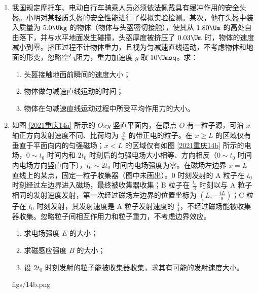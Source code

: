 \documentclass[\gkver]{gaokaozhenti}
\begin{document}
\begin{enumerate}
\item
我国规定摩托车、电动自行车骑乘人员必须依法佩戴具有缓冲作用的安全头盔。小明对某轻质头盔的安全性能进行了模拟实验检测。某次，他在头盔中装入质量为 $5.0\Ukg$ 的物体（物体与头盔密切接触），使其从 $1.80\Um$ 的高处自由落下，并与水平地面发生碰撞，头盔厚度被挤压了 $0.03\Um$ 时，物体的速度减小到零。挤压过程不计物体重力，且视为匀减速直线运动，不考虑物体和地面的形变，忽略空气阻力，重力加速度 $g$ 取 $10\Umsq$。求：
\begin{enumerate}
	\item
	头盔接触地面前瞬间的速度大小；
	\item
	物体做匀减速直线运动的时间；
	\item
	物体在匀减速直线运动过程中所受平均作用力的大小。
\end{enumerate}


\item
如图 \ref{2021重庆14a} 所示的 $Oxy$ 竖直平面内，在原点 $O$ 有一粒子源，可沿 $x$ 轴正方向发射速度不同、比荷均为 $\frac{q}{m}$ 的带正电的粒子。在 $x\geq L$ 的区域仅有垂直于平面向内的匀强磁场；$x<L$ 的区域仅有如图 \ref{2021重庆14b} 所示的电场，$0\sim t_{0}$ 时间内和 $2t_{0}$ 时刻后的匀强电场大小相等、方向相反（$0\sim t_{0}$ 时间内电场方向竖直向下），$t_{0}\sim2t_{0}$ 时间内电场强度为零。在磁场左边界 $x=L$ 直线上的某点，固定一粒子收集器（图中未画出）。0 时刻发射的 A 粒子在 $t_{0}$ 时刻经过左边界进入磁场，最终被收集器收集；B 粒子在 $\frac{t_{0}}{3}$ 时刻以与 A 粒子相同的发射速度发射，第一次经过磁场左边界的位置坐标为 $(L,-\frac{4L}{9})$；C 粒子在 $t_{0}$ 时刻发射，其发射速度是 A 粒子发射速度的 $\frac{1}{4}$，不经过磁场能被收集器收集。忽略粒子间相互作用力和粒子重力，不考虑边界效应。
\begin{enumerate}
	\item
	求电场强度 $E$ 的大小；
	\item
	求磁感应强度 $B$ 的大小；
	\item
	设 $2t_{0}$ 时刻发射的粒子能被收集器收集，求其有可能的发射速度大小。
\end{enumerate}
{figs/14b.png}


\end{enumerate}
\end{document}
